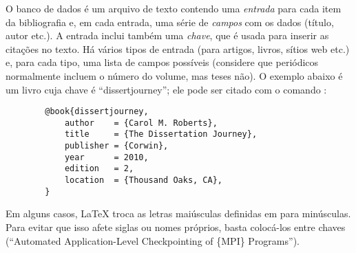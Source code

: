 O banco de dados é um arquivo de texto contendo uma \emph{entrada} para cada
item da bibliografia e, em cada entrada, uma série de \emph{campos} com os
dados (título, autor etc.). A entrada inclui também uma \emph{chave}, que é
usada para inserir as citações no texto. Há vários tipos de entrada (para
artigos, livros, sítios web etc.) e, para cada tipo, uma lista de campos
possíveis (considere que periódicos normalmente incluem o número do volume,
mas teses não). O exemplo abaixo é um livro cuja chave é ``dissertjourney'';
ele pode ser citado com o comando :

\begin{verbatim}
        @book{dissertjourney,
            author    = {Carol M. Roberts},
            title     = {The Dissertation Journey},
            publisher = {Corwin},
            year      = 2010,
            edition   = 2,
            location  = {Thousand Oaks, CA},
        }
\end{verbatim}

Em alguns casos, \LaTeX{} troca as letras maiúsculas definidas em
 para minúsculas. Para evitar que isso afete siglas
ou nomes próprios, basta colocá-los entre chaves (``Automated
Application-Level Checkpointing of \{MPI\} Programs'').

%
%
%
%

